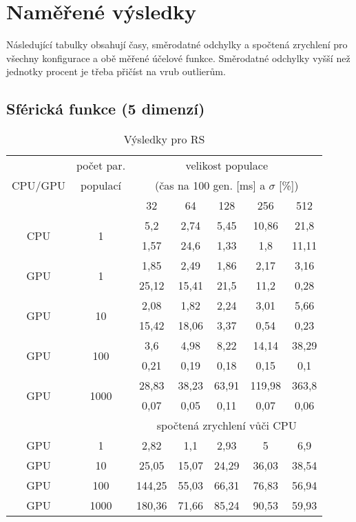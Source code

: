 \chapter{Naměřené výsledky}

Následující tabulky obsahují časy, směrodatné odchylky a spočtená zrychlení pro všechny konfigurace a obě měřené účelové funkce. Směrodatné odchylky vyšší než jednotky procent je třeba přičíst na vrub outlierům.

\section{Sférická funkce (5 dimenzí)}\label{app SP}

\begin{table}[h!]
    \begin{center}
    \begin{tabular}{ccccccc}
      \toprule
      \midrule
      \multirow{3}{*}{CPU/GPU} & počet par. & \multicolumn{5}{c}{velikost populace} \\
      & populací & \multicolumn{5}{c}{(čas na 100 gen. [ms] a $\sigma$ [\%])} \\
      & & 32 & 64 & 128 & 256 & 512 \\
      \midrule
      \multirow{2}{*}{CPU} & \multirow{2}{*}{1}
&5,2&2,74&5,45&10,86&21,8\\
&&1,57&24,6&1,33&1,8&11,11\vspace{1.5mm}\\
\multirow{2}{*}{GPU} & \multirow{2}{*}{1}
&1,85&2,49&1,86&2,17&3,16\\
&&25,12&15,41&21,5&11,2&0,28\vspace{1.5mm}\\
\multirow{2}{*}{GPU} & \multirow{2}{*}{10}
&2,08&1,82&2,24&3,01&5,66\\
&&15,42&18,06&3,37&0,54&0,23\vspace{1.5mm}\\
\multirow{2}{*}{GPU} & \multirow{2}{*}{100}
&3,6&4,98&8,22&14,14&38,29\\
&&0,21&0,19&0,18&0,15&0,1\vspace{1.5mm}\\
\multirow{2}{*}{GPU} & \multirow{2}{*}{1000}
&28,83&38,23&63,91&119,98&363,8\\
&&0,07&0,05&0,11&0,07&0,06\\
\midrule
      & & \multicolumn{5}{c}{spočtená zrychlení vůči CPU} \\
\midrule
      GPU & 1
&2,82&1,1&2,93&5&6,9\\
GPU & 10
&25,05&15,07&24,29&36,03&38,54\\
GPU & 100
&144,25&55,03&66,31&76,83&56,94\\
GPU & 1000
&180,36&71,66&85,24&90,53&59,93\\
      \midrule
      \bottomrule
    \end{tabular}
    \caption{Výsledky pro RS}
    \end{center}
\end{table}
\clearpage


